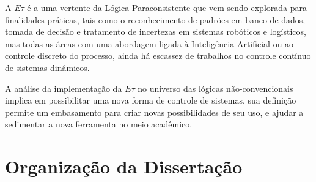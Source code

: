 A $E\tau$ é a uma vertente da Lógica Paraconsistente 
que vem sendo explorada para finalidades práticas, 
tais como o reconhecimento de padrões em banco de dados, 
tomada de decisão e tratamento de incertezas em 
sistemas robóticos e logísticos, 
mas todas as áreas com uma abordagem ligada à 
Inteligência Artificial ou ao controle discreto do processo, 
ainda há escassez de trabalhos no controle contínuo de sistemas dinâmicos. 


A análise da implementação da $E\tau$ no universo das 
lógicas não-convencionais implica em possibilitar 
uma nova forma de controle de sistemas, 
sua definição permite um embasamento para 
criar novas possibilidades de seu uso,
e ajudar a sedimentar a nova ferramenta no meio acadêmico. 









\section{Organização da Dissertação}





